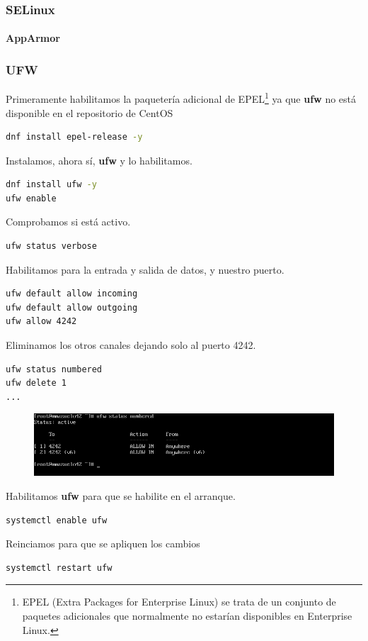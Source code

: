 \documentclass[a4paper]{article}
\begin{document}
\subsubsection{SELinux}
\paragraph{AppArmor}

\pagebreak

\subsubsection{UFW}
Primeramente habilitamos la paquetería adicional de EPEL\footnote{EPEL (Extra Packages for Enterprise Linux) se trata de un conjunto de paquetes adicionales que normalmente no estarían disponibles en Enterprise Linux.} ya que \textbf{ufw} no está disponible en el repositorio de CentOS
\begin{lstlisting}[language=Bash]
dnf install epel-release -y
\end{lstlisting}
Instalamos, ahora sí, \textbf{ufw} y lo habilitamos.
\begin{lstlisting}[language=Bash]
dnf install ufw -y
ufw enable
\end{lstlisting}
Comprobamos si está activo.
\begin{lstlisting}[language=Bash]
ufw status verbose
\end{lstlisting}
Habilitamos para la entrada y salida de datos, y nuestro puerto.
\begin{lstlisting}[language=Bash]
ufw default allow incoming
ufw default allow outgoing
ufw allow 4242
\end{lstlisting}
Eliminamos los otros canales dejando solo al puerto 4242.
\begin{lstlisting}[language=Bash]
ufw status numbered
ufw delete 1
...
\end{lstlisting}
\begin{figure}[h]
\centering
\includegraphics[scale=0.5]{15_CentOS42_ufw_port4242}
\end{figure}

\noindent Habilitamos \textbf{ufw} para que se habilite en el arranque.
\begin{lstlisting}[language=Bash]
systemctl enable ufw
\end{lstlisting}
Reinciamos para que se apliquen los cambios
\begin{lstlisting}[language=Bash]
systemctl restart ufw
\end{lstlisting}
\end{document}
